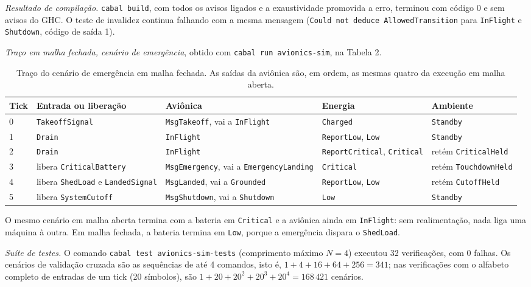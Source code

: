 \documentclass[12pt,a4paper]{article}
\begin{document}
\textit{Resultado de compilação.} \texttt{cabal build}, com todos os avisos ligados e a exaustividade promovida a erro, terminou com código 0 e sem avisos do GHC. O teste de invalidez continua falhando com a mesma mensagem (\texttt{Could not deduce AllowedTransition} para \texttt{InFlight} e \texttt{Shutdown}, código de saída 1).

\textit{Traço em malha fechada, cenário de emergência}, obtido com \texttt{cabal run avionics-sim}, na Tabela 2.

\begin{table}[h]
\centering
\scriptsize
\begin{tabular}{|p{0.7cm}|p{3.1cm}|p{4.3cm}|p{3.0cm}|p{2.9cm}|}
\hline
Tick & Entrada ou liberação & Aviônica & Energia & Ambiente \\
\hline
0 & \texttt{TakeoffSignal} & \texttt{MsgTakeoff}, vai a \texttt{InFlight} & \texttt{Charged} & \texttt{Standby} \\
\hline
1 & \texttt{Drain} & \texttt{InFlight} & \texttt{ReportLow}, \texttt{Low} & \texttt{Standby} \\
\hline
2 & \texttt{Drain} & \texttt{InFlight} & \texttt{ReportCritical}, \texttt{Critical} & retém \texttt{CriticalHeld} \\
\hline
3 & libera \texttt{CriticalBattery} & \texttt{MsgEmergency}, vai a \texttt{EmergencyLanding} & \texttt{Critical} & retém \texttt{TouchdownHeld} \\
\hline
4 & libera \texttt{ShedLoad} e \texttt{LandedSignal} & \texttt{MsgLanded}, vai a \texttt{Grounded} & \texttt{ReportLow}, \texttt{Low} & retém \texttt{CutoffHeld} \\
\hline
5 & libera \texttt{SystemCutoff} & \texttt{MsgShutdown}, vai a \texttt{Shutdown} & \texttt{Low} & \texttt{Standby} \\
\hline
\end{tabular}
\caption{Traço do cenário de emergência em malha fechada. As saídas da aviônica são, em ordem, as mesmas quatro da execução em malha aberta.}
\end{table}

O mesmo cenário em malha aberta termina com a bateria em \texttt{Critical} e a aviônica ainda em \texttt{InFlight}: sem realimentação, nada liga uma máquina à outra. Em malha fechada, a bateria termina em \texttt{Low}, porque a emergência dispara o \texttt{ShedLoad}.

\textit{Suíte de testes.} O comando \texttt{cabal test avionics-sim-tests} (comprimento máximo $N = 4$) executou 32 verificações, com 0 falhas. Os cenários de validação cruzada são as sequências de até 4 comandos, isto é, $1 + 4 + 16 + 64 + 256 = 341$; nas verificações com o alfabeto completo de entradas de um tick (20 símbolos), são $1 + 20 + 20^2 + 20^3 + 20^4 = 168\,421$ cenários.
\end{document}
